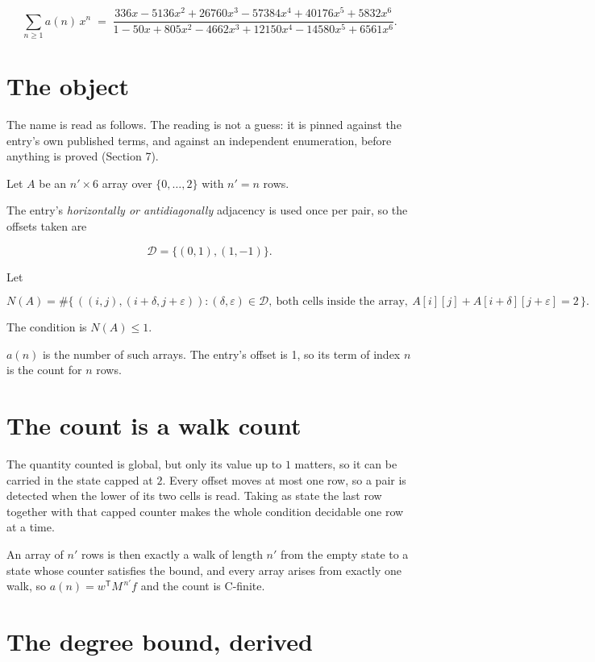 \documentclass[11pt]{article}
\theoremstyle{definition}
\begin{document}
\[\sum_{n \ge 1} a(n)\,x^n \;=\; \frac{336x - 5136x^{2} + 26760x^{3} - 57384x^{4} + 40176x^{5} + 5832x^{6}}{1 - 50x + 805x^{2} - 4662x^{3} + 12150x^{4} - 14580x^{5} + 6561x^{6}}.\]

\section{The object}

The name is read as follows. The reading is not a guess: it is pinned against the entry's own published terms, and against an independent enumeration, before anything is proved (Section 7).

Let $A$ be an $n' \times 6$ array over $\{0,\dots,2\}$ with $n' = n$ rows.

The entry's {\itshape horizontally or antidiagonally} adjacency is used once per pair, so the offsets taken are

\[\mathcal{D} = \{(0,1), (1,-1)\}.\]

Let

\[N(A) = \#\bigl\{\,((i,j),(i{+}\delta,j{+}\varepsilon)) : (\delta,\varepsilon) \in \mathcal{D},\ \text{both cells inside the array},\ A[i][j] + A[i{+}\delta][j{+}\varepsilon] = 2\,\bigr\}.\]

The condition is $N(A) \le 1$.

$a(n)$ is the number of such arrays. The entry's offset is 1, so its term of index $n$ is the count for $n$ rows.

\section{The count is a walk count}

The quantity counted is global, but only its value up to $1$ matters, so it can be carried in the state capped at $2$. Every offset moves at most one row, so a pair is detected when the lower of its two cells is read. Taking as state the last row together with that capped counter makes the whole condition decidable one row at a time.

An array of $n'$ rows is then exactly a walk of length $n'$ from the empty state to a state whose counter satisfies the bound, and every array arises from exactly one walk, so $a(n) = w^{\mathsf T}M^{\,n'}f$ and the count is C-finite.

\section{The degree bound, derived}
\end{document}
